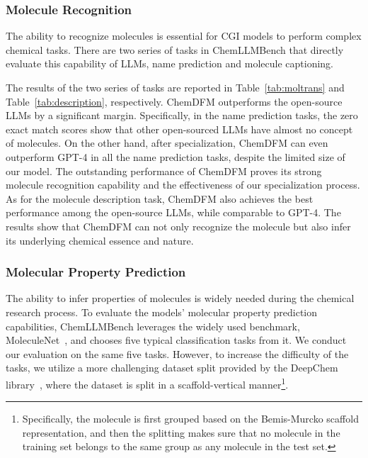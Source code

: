 \subsubsection{Molecule Recognition}\label{molrec}

The ability to recognize molecules is essential for CGI models to perform complex chemical tasks. There are two series of tasks in ChemLLMBench that directly evaluate this capability of LLMs, name prediction and molecule captioning.

The results of the two series of tasks are reported in Table~\ref{tab:moltrans} and Table~\ref{tab:description}, respectively. ChemDFM outperforms the open-source LLMs by a significant margin. Specifically, in the name prediction tasks, the zero exact match scores show that other open-sourced LLMs have almost no concept of molecules.
On the other hand, after specialization, ChemDFM can even outperform GPT-4 in all the name prediction tasks, despite the limited size of our model. 
The outstanding performance of ChemDFM proves its strong molecule recognition capability and the effectiveness of our specialization process. As for the molecule description task, ChemDFM also achieves the best performance among the open-source LLMs, while comparable to GPT-4. The results show that ChemDFM can not only recognize the molecule but also infer its underlying chemical essence and nature.

\subsubsection{Molecular Property Prediction}\label{molpp}

The ability to infer properties of molecules is widely needed during the chemical research process. To evaluate the models' molecular property prediction capabilities, ChemLLMBench leverages the widely used benchmark, MoleculeNet~\cite{wu2018moleculenet}, and chooses five typical classification tasks from it. We conduct our evaluation on the same five tasks. However, to increase the difficulty of the tasks, we utilize a more challenging dataset split provided by the DeepChem library~\cite{deepchem}, where the dataset is split
in a scaffold-vertical manner\footnote{Specifically, the molecule is first grouped based on the Bemis-Murcko scaffold representation, and then the splitting makes sure that no molecule in the training set belongs to the same group as any molecule in the test set.}.

